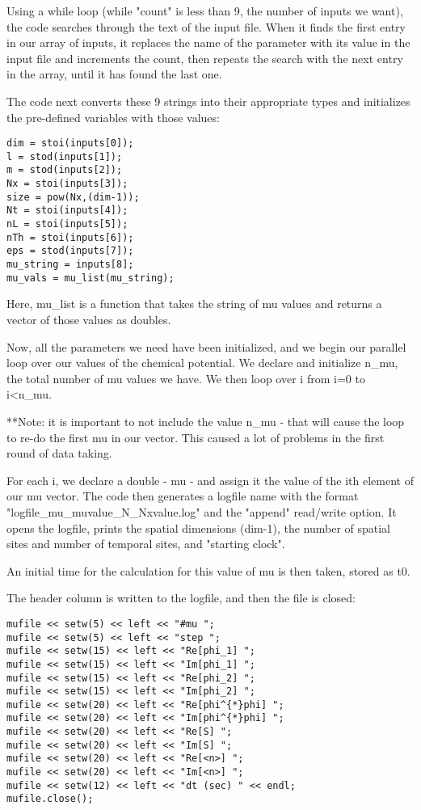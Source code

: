 \documentclass[../../RotatingBosons.tex]{subfiles}
\begin{document}
Using a while loop (while "count" is less than 9, the number of inputs we want), the code searches through the text of the input file. When it finds the first entry in our array of inputs, it replaces the name of the parameter with its value in the input file and increments the count, then repeats the search with the next entry in the array, until it has found the last one.

The code next converts these 9 strings into their appropriate types and initializes the pre-defined variables with those values:
\begin{lstlisting}
dim = stoi(inputs[0]);
l = stod(inputs[1]);
m = stod(inputs[2]);
Nx = stoi(inputs[3]);
size = pow(Nx,(dim-1));
Nt = stoi(inputs[4]);
nL = stoi(inputs[5]);
nTh = stoi(inputs[6]);
eps = stod(inputs[7]);
mu_string = inputs[8];
mu_vals = mu_list(mu_string);
\end{lstlisting}
Here, mu\_list is a function that takes the string of mu values and returns a vector of those values as doubles.

Now, all the parameters we need have been initialized, and we begin our parallel loop over our values of the chemical potential. We declare and initialize n\_mu, the total number of mu values we have. We then loop over i from i=0 to i<n\_mu.

**Note: it is important to not include the value n\_mu - that will cause the loop to re-do the first mu in our vector. This caused a lot of problems in the first round of data taking.

For each i, we declare a double - mu - and assign it the value of the ith element of our mu vector. The code then generates a logfile name with the format "logfile\_mu\_muvalue\_N\_Nxvalue.log" and the "append" read/write option. It opens the logfile, prints the spatial dimensions (dim-1), the number of spatial sites and number of temporal sites, and "starting clock".

An initial time for the calculation for this value of mu is then taken, stored as t0.

The header column is written to the logfile, and then the file is closed:
\begin{lstlisting}	
mufile << setw(5) << left << "#mu ";
mufile << setw(5) << left << "step ";
mufile << setw(15) << left << "Re[phi_1] ";
mufile << setw(15) << left << "Im[phi_1] ";
mufile << setw(15) << left << "Re[phi_2] ";
mufile << setw(15) << left << "Im[phi_2] ";
mufile << setw(20) << left << "Re[phi^{*}phi] ";
mufile << setw(20) << left << "Im[phi^{*}phi] ";
mufile << setw(20) << left << "Re[S] ";
mufile << setw(20) << left << "Im[S] ";
mufile << setw(20) << left << "Re[<n>] ";
mufile << setw(20) << left << "Im[<n>] ";
mufile << setw(12) << left << "dt (sec) " << endl;
mufile.close();
\end{lstlisting}
\end{document}
